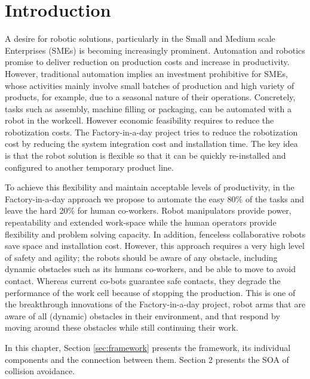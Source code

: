 
\section{Introduction}
A desire for robotic solutions, particularly in the Small and Medium scale Enterprises (SMEs) is becoming increasingly prominent. Automation and robotics promise to deliver reduction on production costs and increase in productivity. However, traditional automation implies an investment prohibitive for SMEs, whose activities mainly involve small batches of production and high variety of products, for example, due to a seasonal nature of their operations. Concretely, tasks such as assembly, machine filling or packaging, can be automated with a robot in the workcell. However economic feasibility requires to reduce the robotization costs. The Factory-in-a-day project \cite{fiad} tries to reduce the robotization cost by reducing the system integration cost and installation time. The key idea is that the robot solution is flexible so that it can be quickly re-installed and configured to another temporary product line. 

To achieve this flexibility and maintain acceptable levels of productivity, in the Factory-in-a-day approach we propose to automate the easy 80\% of the tasks and leave the hard 20\% for human co-workers. Robot manipulators provide power, repeatability and extended work-space while the human operators provide flexibility and problem solving capacity. In addition, fenceless collaborative robots save space and installation cost. However, this approach requires a very high level of safety and agility; the robots should be aware of any obstacle, including dynamic obstacles such as its humans co-workers, and be able to move to avoid contact. Whereas current co-bots guarantee safe contacts, they degrade the performance of the work cell because of stopping the production. This is one of the breakthrough innovations of the Factory-in-a-day project, robot arms that are aware of all (dynamic) obstacles in their environment, and that respond by moving around these obstacles while still continuing their work.

In this chapter,  Section \ref{sec:framework} presents the framework, its individual components and the connection between them.  Section 2 presents the SOA of collision avoidance.




